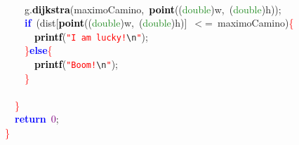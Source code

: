 \documentclass[10pt,a4paper,twoside]{article}
\begin{document}
{{{{{\mbox{} \\
\mbox{}\ \ \ \ g\textcolor{BrickRed}{.}\textbf{\textcolor{Black}{dijkstra}}\textcolor{BrickRed}{(}maximoCamino\textcolor{BrickRed}{,}\ \textbf{\textcolor{Black}{point}}\textcolor{BrickRed}{((}\textcolor{ForestGreen}{double}\textcolor{BrickRed}{)}w\textcolor{BrickRed}{,}\ \textcolor{BrickRed}{(}\textcolor{ForestGreen}{double}\textcolor{BrickRed}{)}h\textcolor{BrickRed}{));} \\
\mbox{}\ \ \ \ \textbf{\textcolor{Blue}{if}}\ \textcolor{BrickRed}{(}dist\textcolor{BrickRed}{[}\textbf{\textcolor{Black}{point}}\textcolor{BrickRed}{((}\textcolor{ForestGreen}{double}\textcolor{BrickRed}{)}w\textcolor{BrickRed}{,}\ \textcolor{BrickRed}{(}\textcolor{ForestGreen}{double}\textcolor{BrickRed}{)}h\textcolor{BrickRed}{)]}\ \textcolor{BrickRed}{$<$=}\ maximoCamino\textcolor{BrickRed}{)}\textcolor{Red}{\{} \\
\mbox{}\ \ \ \ \ \ \textbf{\textcolor{Black}{printf}}\textcolor{BrickRed}{(}\texttt{\textcolor{Red}{"{}I\ am\ lucky!}}\texttt{\textcolor{CarnationPink}{\textbackslash{}n}}\texttt{\textcolor{Red}{"{}}}\textcolor{BrickRed}{);} \\
\mbox{}\ \ \ \ \textcolor{Red}{\}}\textbf{\textcolor{Blue}{else}}\textcolor{Red}{\{} \\
\mbox{}\ \ \ \ \ \ \textbf{\textcolor{Black}{printf}}\textcolor{BrickRed}{(}\texttt{\textcolor{Red}{"{}Boom!}}\texttt{\textcolor{CarnationPink}{\textbackslash{}n}}\texttt{\textcolor{Red}{"{}}}\textcolor{BrickRed}{);} \\
\mbox{}\ \ \ \ \textcolor{Red}{\}} \\
\mbox{}\ \ \  \\
\mbox{}\ \ \textcolor{Red}{\}} \\
\mbox{}\ \ \textbf{\textcolor{Blue}{return}}\ \textcolor{Purple}{0}\textcolor{BrickRed}{;} \\
\mbox{}\textcolor{Red}{\}} \\

} \normalfont\normalsize

}}}}
\end{document}
